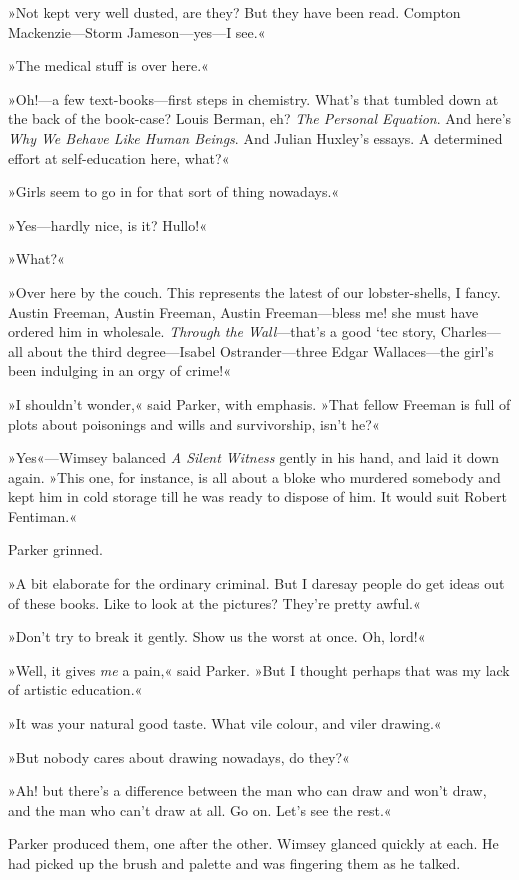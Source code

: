 »Not kept very well dusted, are they? But they have been read. Compton Mackenzie—Storm Jameson—yes—I see.«

»The medical stuff is over here.«

»Oh!—a few text-books—first steps in chemistry. What's that tumbled down at the back of the book-case? Louis Berman, eh? \textit{The Personal Equation}. And here's \textit{Why We Behave Like Human Beings}. And Julian Huxley's essays. A determined effort at self-education here, what?«

»Girls seem to go in for that sort of thing nowadays.«

»Yes—hardly nice, is it? Hullo!«

»What?«

»Over here by the couch. This represents the latest of our lobster-shells, I fancy. Austin Freeman, Austin Freeman, Austin Freeman—bless me! she must have ordered him in wholesale. \textit{Through the Wall}—that's a good `tec story, Charles—all about the third degree—Isabel Ostrander—three Edgar Wallaces—the girl's been indulging in an orgy of crime!«

»I shouldn't wonder,« said Parker, with emphasis. »That fellow Freeman is full of plots about poisonings and wills and survivorship, isn't he?«

»Yes«—Wimsey balanced \textit{A Silent Witness} gently in his hand, and laid it down again. »This one, for instance, is all about a bloke who murdered somebody and kept him in cold storage till he was ready to dispose of him. It would suit Robert Fentiman.«

Parker grinned.

»A bit elaborate for the ordinary criminal. But I daresay people do get ideas out of these books. Like to look at the pictures? They're pretty awful.«

»Don't try to break it gently. Show us the worst at once\textellipsis. Oh, lord!«

»Well, it gives \textit{me} a pain,« said Parker. »But I thought perhaps that was my lack of artistic education.«

»It was your natural good taste. What vile colour, and viler drawing.«

»But nobody cares about drawing nowadays, do they?«

»Ah! but there's a difference between the man who can draw and won't draw, and the man who can't draw at all. Go on. Let's see the rest.«

Parker produced them, one after the other. Wimsey glanced quickly at each. He had picked up the brush and palette and was fingering them as he talked.

